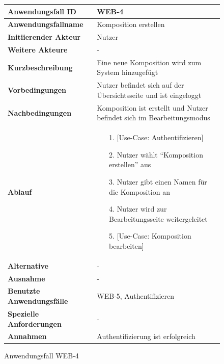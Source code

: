 \begin{figure}[h]
	\centering
	\begin{tabularx}{\textwidth}{ X | X }
		\textbf{Anwendungsfall ID} & WEB-4 \\ \hline
		\textbf{Anwendungsfallname} & Komposition erstellen \\ \hline
		\textbf{Initiierender Akteur} & Nutzer \\ \hline
		\textbf{Weitere Akteure} & - \\ \hline
		\textbf{Kurzbeschreibung} & Eine neue Komposition wird zum System hinzugefügt \\ \hline
		\textbf{Vorbedingungen} & Nutzer befindet sich auf der Übersichtsseite und ist eingeloggt  \\ \hline
		\textbf{Nachbedingungen} & Komposition ist erstellt und Nutzer befindet sich im Bearbeitungsmodus \\ \hline
		\textbf{Ablauf} &
		\begin{enumerate}
			\item[1.]  [Use-Case: Authentifizieren]
			\item[2.]  Nutzer wählt ``Komposition erstellen'' aus
			\item[3.]  Nutzer gibt einen Namen für die Komposition an
			\item[4.]  Nutzer wird zur Bearbeitungsseite weitergeleitet
			\item[5.]  [Use-Case: Komposition bearbeiten]
		\end{enumerate} \\ \hline
		\textbf{Alternative} & - \\ \hline
		\textbf{Ausnahme} & - \\ \hline
		\textbf{Benutzte Anwendungsfälle} & WEB-5, Authentifizieren\\ \hline
		\textbf{Spezielle Anforderungen} & - \\ \hline
		\textbf{Annahmen} & Authentifizierung ist erfolgreich
	\end{tabularx}
	\caption{Anwendungsfall WEB-4}
	\label{fig:anwendungsfall-server-tabelle-web-4}
\end{figure}


